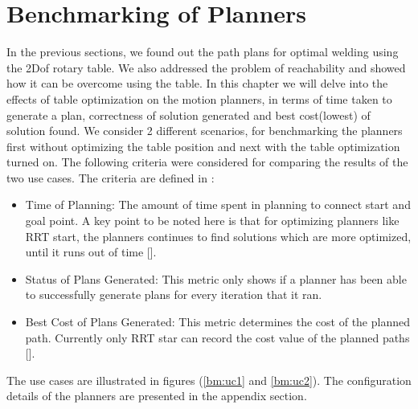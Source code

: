 \section{Benchmarking of Planners}
\localtableofcontents
In the previous sections, we found out the path plans for optimal welding using the 2Dof rotary table. We also addressed the problem of reachability and showed how it can be overcome using the table. In this chapter we will delve into the effects of  table optimization on the motion planners, in terms of time taken to generate a plan, correctness of solution generated and best cost(lowest) of solution found. We consider 2 different scenarios, for benchmarking the planners first without optimizing the table position and next with the table optimization turned on. The following criteria were considered for comparing the results of the two use cases. The criteria are defined in \citet{moll2015benchmarking-motion-planning-algorithms}:
\begin{itemize}
	\item Time of Planning: The amount of time spent in planning to connect start and goal point. A key point to be noted here is that for optimizing planners like RRT start, the planners continues to find solutions which are more optimized, until it runs out of time [\citet{moll2015benchmarking-motion-planning-algorithms}]. 
	\item Status of Plans Generated: This metric only shows if a planner has been able to successfully generate plans for every iteration that it ran.
	\item Best Cost of Plans Generated: This metric determines the cost of the planned path. Currently only RRT star can record the cost value of the planned paths [\citet{moll2015benchmarking-motion-planning-algorithms}].
\end{itemize}
The use cases are illustrated in figures (\ref{bm:uc1} and \ref{bm:uc2}).
The configuration details of the planners are presented in the appendix section.
